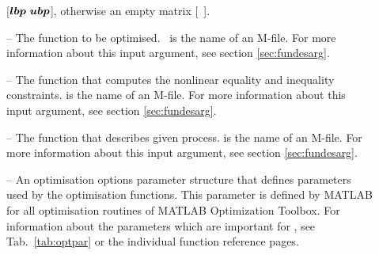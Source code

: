 \begin{description}
  , otherwise an empty matrix [~].
\item[\argfun{objfun}] --  The function to be
  optimised.~ is the name of an M-file. For more
  information about this input argument, see section
  \ref{sec:fundesarg}. 
\item[\argfun{confun}] --  The function that computes the nonlinear
  equality and inequality constraints.  is the name of
  an M-file. For more information about this input argument, see
  section \ref{sec:fundesarg}.  
\item[\argfun{process}] -- The function that describes given
  process.  is the name of an M-file. For more
  information about this input argument, see section
  \ref{sec:fundesarg}. 
\item[\argfun{options}] -- An optimisation options parameter structure
  that defines parameters used by the optimisation functions. This
  parameter is defined by MATLAB for all optimisation routines of
  MATLAB Optimization Toolbox. For information about the parameters 
  which are important for , see Tab.~\ref{tab:optpar} or
  the individual function reference pages.
\end{description}

